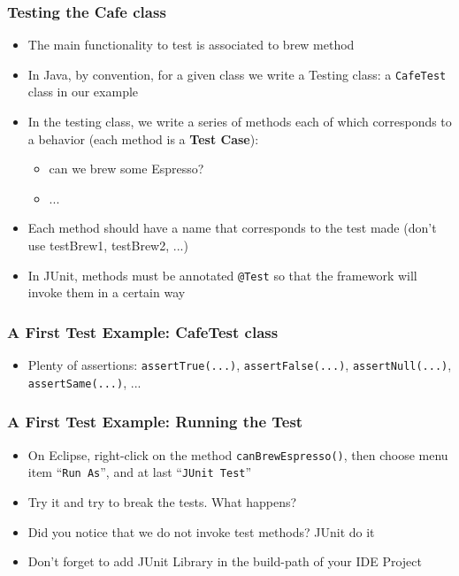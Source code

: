 \documentclass{beamer}
\begin{document}
\begin{frame}
\frametitle{Testing the Cafe class}
\begin{itemize}
\item The main functionality to test is associated to brew method
\item In Java, by convention, for a given class we write a Testing
  class: a \texttt{CafeTest} class in our example
\item In the testing class, we write a series of methods each of which
  corresponds to a behavior (each method is a \textbf{Test Case}):
  \begin{itemize}
  \item can we brew some Espresso?
  \item ...
  \end{itemize}
\item Each method should have a name that corresponds to the test made
  (don't use testBrew1, testBrew2, ...)
\item In JUnit, methods must be annotated \texttt{@Test} so that the
  framework will invoke them in a certain way
\end{itemize}
\end{frame}

\begin{frame}
\frametitle{A First Test Example: CafeTest class}
  \vspace{5.2cm}
\begin{itemize}
\item[]  Plenty of assertions: \texttt{assertTrue(...)},
  \texttt{assertFalse(...)}, \texttt{assertNull(...)},
  \texttt{assertSame(...)}, ...
  \end{itemize}
\end{frame}

\begin{frame}
\frametitle{A First Test Example: Running the Test}
  \begin{itemize}
  \item On Eclipse, right-click on the method
    \texttt{canBrewEspresso()}, then choose menu item ``\texttt{Run
      As}'', and at last ``\texttt{JUnit Test}'' \vspace{4.2cm}
  \item Try it and try to break the tests. What happens?
  \item Did you notice that we do not invoke test methods? JUnit do it
    \footnotesize
  \item Don't forget to add JUnit Library in
    the build-path of your IDE Project
    \normalsize
  \end{itemize}
  
\end{frame}
\end{document}
